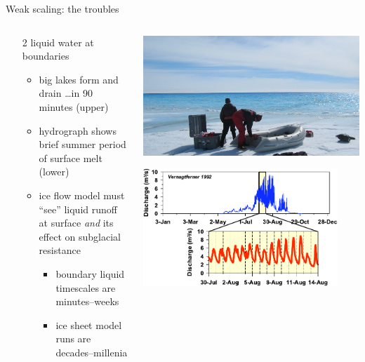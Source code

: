 \documentclass[intlimits]{beamer}
\begin{document}
\begin{frame}{Weak scaling: the troubles}
\begin{columns}
\begin{column}{0.5\textwidth}
  \begin{enumerate}
  \item[2] \alert{liquid water} at boundaries
    \begin{itemize}
    \item big lakes form and drain \dots in 90 minutes  (upper)
    \item hydrograph shows brief summer period of surface melt (lower)
    \item ice flow model must ``see'' liquid runoff at surface \emph{and} its effect on subglacial resistance
      \begin{itemize}
      \item boundary liquid timescales are minutes--weeks
      \item ice sheet model runs are decades--millenia
      \end{itemize}
    \end{itemize}
  \end{enumerate}
\end{column}
\begin{column}{0.5\textwidth}
\vspace{-1cm}

      \begin{center}
        \includegraphics[width=\textwidth]{Greenland06-10}
        
      \end{center}

      \begin{center}
        \includegraphics[width=0.9\textwidth]{ferner}
        

\end{center}
\end{column}
\end{columns}
\end{frame}
\end{document}
